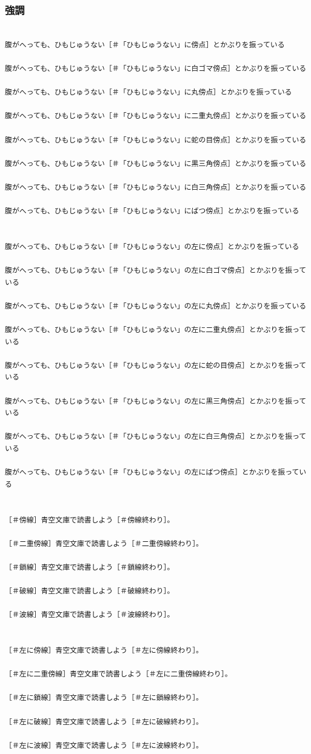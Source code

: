 \documentclass[a4paper,tate]{jlreq}
\begin{document}
\subsubsection*{強調}
\footnotesize
\linespread{1.0}
\begin{verbatim}

腹がへっても、ひもじゅうない［＃「ひもじゅうない」に傍点］とかぶりを振っている

腹がへっても、ひもじゅうない［＃「ひもじゅうない」に白ゴマ傍点］とかぶりを振っている

腹がへっても、ひもじゅうない［＃「ひもじゅうない」に丸傍点］とかぶりを振っている

腹がへっても、ひもじゅうない［＃「ひもじゅうない」に二重丸傍点］とかぶりを振っている

腹がへっても、ひもじゅうない［＃「ひもじゅうない」に蛇の目傍点］とかぶりを振っている

腹がへっても、ひもじゅうない［＃「ひもじゅうない」に黒三角傍点］とかぶりを振っている

腹がへっても、ひもじゅうない［＃「ひもじゅうない」に白三角傍点］とかぶりを振っている

腹がへっても、ひもじゅうない［＃「ひもじゅうない」にばつ傍点］とかぶりを振っている


腹がへっても、ひもじゅうない［＃「ひもじゅうない」の左に傍点］とかぶりを振っている

腹がへっても、ひもじゅうない［＃「ひもじゅうない」の左に白ゴマ傍点］とかぶりを振っている

腹がへっても、ひもじゅうない［＃「ひもじゅうない」の左に丸傍点］とかぶりを振っている

腹がへっても、ひもじゅうない［＃「ひもじゅうない」の左に二重丸傍点］とかぶりを振っている

腹がへっても、ひもじゅうない［＃「ひもじゅうない」の左に蛇の目傍点］とかぶりを振っている

腹がへっても、ひもじゅうない［＃「ひもじゅうない」の左に黒三角傍点］とかぶりを振っている

腹がへっても、ひもじゅうない［＃「ひもじゅうない」の左に白三角傍点］とかぶりを振っている

腹がへっても、ひもじゅうない［＃「ひもじゅうない」の左にばつ傍点］とかぶりを振っている


［＃傍線］青空文庫で読書しよう［＃傍線終わり］。

［＃二重傍線］青空文庫で読書しよう［＃二重傍線終わり］。

［＃鎖線］青空文庫で読書しよう［＃鎖線終わり］。

［＃破線］青空文庫で読書しよう［＃破線終わり］。

［＃波線］青空文庫で読書しよう［＃波線終わり］。


［＃左に傍線］青空文庫で読書しよう［＃左に傍線終わり］。

［＃左に二重傍線］青空文庫で読書しよう［＃左に二重傍線終わり］。

［＃左に鎖線］青空文庫で読書しよう［＃左に鎖線終わり］。

［＃左に破線］青空文庫で読書しよう［＃左に破線終わり］。

［＃左に波線］青空文庫で読書しよう［＃左に波線終わり］。



\end{verbatim}
\end{document}
